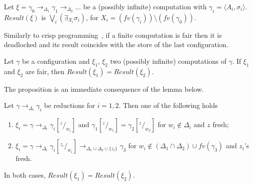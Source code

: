 \documentclass[main.tex]{subfiles}
\begin{document}
\begin{definition}[Observables]\label{def:observables}
Let $\xi = \gamma_0  \rightarrow_{\Delta_1} \gamma_1  \rightarrow_{\Delta_2} \dots$ be a (possibly infinite) computation with $\gamma_i = \langle A_i, \sigma_i\rangle$.
%
$\mathit{Result}(\xi)$ 
is $\bigvee_i (\exists_{X_i} \sigma_i)$, for $X_i = (fv(\gamma_i))\setminus(fv(\gamma_0))$.
\end{definition}

%

Similarly to crisp programming~\cite{popl91}, if a finite computation is fair
then it is deadlocked and 
its result coincides with the store of the last configuration.

\begin{proposition}[Confluence]\label{prop:confluence}
Let $\gamma$ be a configuration and $\xi_1$, $\xi_2$ two (possibly infinite)
computations of $\gamma$.
%
If $\xi_1$ and $\xi_2$ are fair, then $\mathit{Result}(\xi_1) = \mathit{Result}(\xi_2)$.
\end{proposition}


%

The proposition is an immediate consequence of the lemma below.

\begin{lemma}\label{lemma:upto}
Let $\gamma \rightarrow_{\Delta_i} \gamma_i$ be reductions for $i =  1, 2$.
Then one of the following holds
\begin{enumerate}
\item $\xi_i = \gamma \rightarrow_{\Delta_i} \gamma_i[^z/_{w_i}]$
and $\gamma_1[^z/_{w_1}] =  \gamma_2[^z/_{w_2}]$
for $w_i \not \in \Delta_i$ and $z$ fresh;
\item
$\xi_i = \gamma \rightarrow_{\Delta_i} \gamma_i[^{z_i}/_{w_i}] \rightarrow_{\Delta_1 \cup \Delta_2 \cup \{z_i\}} \gamma_3$
for $w_i \not \in (\Delta_1 \cap \Delta_2) \cup fv(\gamma_3)$ and $z_i$'s fresh.
\end{enumerate}
In both cases, $Result(\xi_1) = Result(\xi_2)$.
\end{lemma}
\end{document}
